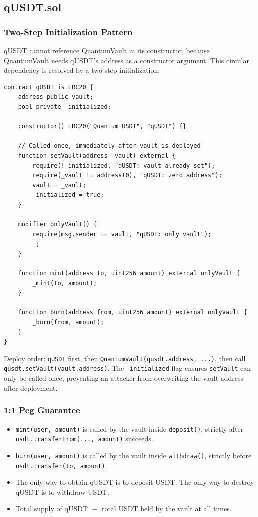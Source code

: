 \documentclass[11pt,a4paper]{article}
\begin{document}
\subsection{qUSDT.sol}

\subsubsection{Two-Step Initialization Pattern}

qUSDT cannot reference QuantumVault in its constructor, because QuantumVault needs qUSDT's address as a constructor argument. This circular dependency is resolved by a two-step initialization:

\begin{lstlisting}[style=solidity, caption={qUSDT two-step initialization}]
contract qUSDT is ERC20 {
    address public vault;
    bool private _initialized;

    constructor() ERC20("Quantum USDT", "qUSDT") {}

    // Called once, immediately after vault is deployed
    function setVault(address _vault) external {
        require(!_initialized, "qUSDT: vault already set");
        require(_vault != address(0), "qUSDT: zero address");
        vault = _vault;
        _initialized = true;
    }

    modifier onlyVault() {
        require(msg.sender == vault, "qUSDT: only vault");
        _;
    }

    function mint(address to, uint256 amount) external onlyVault {
        _mint(to, amount);
    }

    function burn(address from, uint256 amount) external onlyVault {
        _burn(from, amount);
    }
}
\end{lstlisting}

\begin{infobox}
Deploy order: \texttt{qUSDT} first, then \texttt{QuantumVault(qusdt.address, ...)}, then call \texttt{qusdt.setVault(vault.address)}. The \texttt{\_initialized} flag ensures \texttt{setVault} can only be called once, preventing an attacker from overwriting the vault address after deployment.
\end{infobox}

\subsubsection{1:1 Peg Guarantee}

\begin{itemize}
  \item \texttt{mint(user, amount)} is called by the vault inside \texttt{deposit()}, strictly after \texttt{usdt.transferFrom(..., amount)} succeeds.
  \item \texttt{burn(user, amount)} is called by the vault inside \texttt{withdraw()}, strictly before \texttt{usdt.transfer(to, amount)}.
  \item The only way to obtain qUSDT is to deposit USDT. The only way to destroy qUSDT is to withdraw USDT.
  \item Total supply of qUSDT $\equiv$ total USDT held by the vault at all times.
\end{itemize}
\end{document}
